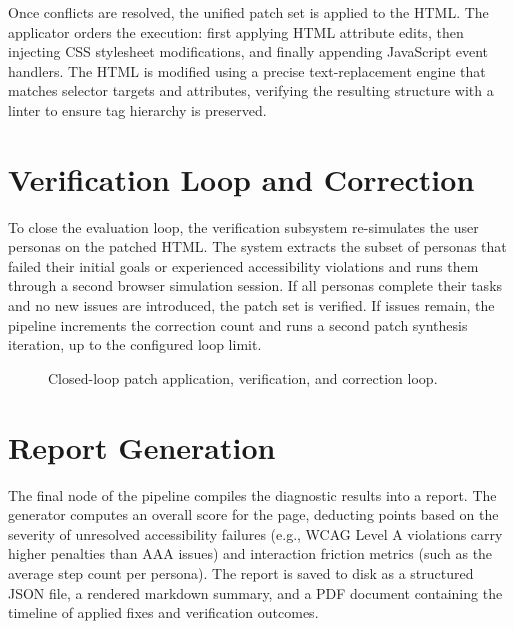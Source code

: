 Once conflicts are resolved, the unified patch set is applied to the HTML. The applicator orders the execution: first applying HTML attribute edits, then injecting CSS stylesheet modifications, and finally appending JavaScript event handlers. The HTML is modified using a precise text-replacement engine that matches selector targets and attributes, verifying the resulting structure with a linter to ensure tag hierarchy is preserved.


\section{Verification Loop and Correction}
\label{sec:verification-loop}

To close the evaluation loop, the verification subsystem re-simulates the user personas on the patched HTML. The system extracts the subset of personas that failed their initial goals or experienced accessibility violations and runs them through a second browser simulation session. If all personas complete their tasks and no new issues are introduced, the patch set is verified. If issues remain, the pipeline increments the correction count and runs a second patch synthesis iteration, up to the configured loop limit.

\begin{figure}[htbp]
  \centering
  \caption{Closed-loop patch application, verification, and correction loop.}
  \label{fig:verification-loop}
\end{figure}


\section{Report Generation}
\label{sec:report-generation}

The final node of the pipeline compiles the diagnostic results into a report. The generator computes an overall score for the page, deducting points based on the severity of unresolved accessibility failures (e.g., WCAG Level A violations carry higher penalties than AAA issues) and interaction friction metrics (such as the average step count per persona). The report is saved to disk as a structured JSON file, a rendered markdown summary, and a PDF document containing the timeline of applied fixes and verification outcomes.
